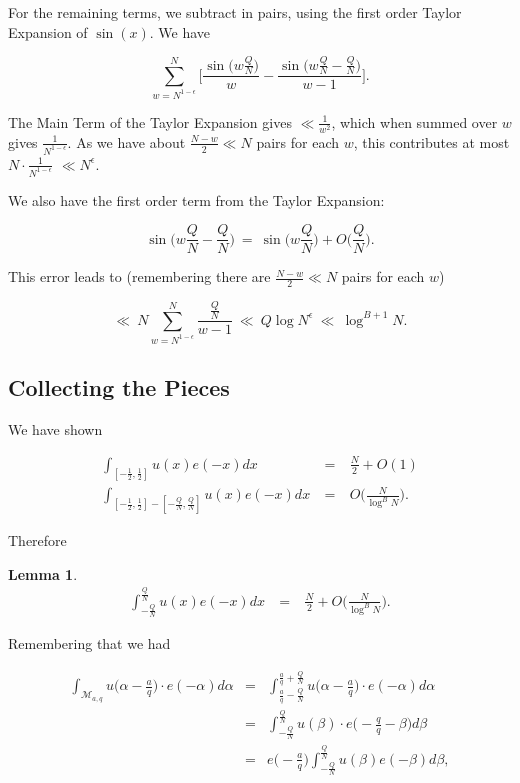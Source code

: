 \documentclass[12pt,letterpaper]{report}
\newcommand\be{\begin{equation}}
\newcommand\ee{\end{equation}}
\newcommand\bea{\begin{eqnarray}}
\newcommand\eea{\end{eqnarray}}
\newcommand{\foh}{\frac{1}{2}}  %
\newtheorem{lem}[thm]{Lemma}
\begin{document}
For the remaining terms, we subtract in pairs, using the first
order Taylor Expansion of $\sin(x)$. We have

\be \sum_{w= N^{1-\epsilon}}^N \Bigg[ \frac{\sin\Big( w
\frac{Q}{N} \Big)}{w} - \frac{\sin\Big( w\frac{Q}{N} - \frac{Q}{N}
\Big)}{w-1} \Bigg]. \ee

The Main Term of the Taylor Expansion gives $\ll \frac{1}{w^2}$,
which when summed over $w$ gives $\frac{1}{N^{1 - \epsilon}}$. As
we have about $\frac{N-w}{2} \ll N$ pairs for each $w$, this
contributes at most $N \cdot \frac{1}{N^{1 - \epsilon}}$ $\ll
N^\epsilon$.

We also have the first order term from the Taylor Expansion:

\be \sin\Big( w\frac{Q}{N} - \frac{Q}{N} \Big) \ = \ \sin\Big(
w\frac{Q}{N} \Big) + O\Big( \frac{Q}{N} \Big). \ee

This error leads to (remembering there are $\frac{N-w}{2} \ll N$
pairs for each $w$)

\be \ll \ N \sum_{w= N^{1-\epsilon}}^N \frac{ \frac{Q}{N} }{w-1} \
\ll \ Q \log N^\epsilon \ \ll \ \log^{B + 1} N. \ee


\subsection{Collecting the Pieces}

We have shown

\bea \int_{[-\foh,\foh]} u(x)e(-x)dx & \ = \ & \frac{N}{2} + O(1)
\nonumber\\ \int_{[-\foh,\foh] - [-\frac{Q}{N},\frac{Q}{N}]}
u(x)e(-x)dx & \ = \ & O\Big( \frac{N}{\log^B N} \Big). \eea

Therefore

\begin{lem}

\bea  \int_{-\frac{Q}{N}}^{\frac{Q}{N}} u(x) e(-x)dx & \ = \ &
\frac{N}{2} + O\Big(\frac{N}{\log^B N}\Big). \eea
\end{lem}


Remembering that we had

\bea \int_{\mathcal{M}_{a,q}} u\Big( \alpha - \frac{a}{q} \Big)
\cdot e(-\alpha)d\alpha  &=&
\int_{\frac{a}{q}-\frac{Q}{N}}^{\frac{a}{q}+\frac{Q}{N}} u\Big(
\alpha - \frac{a}{q} \Big) \cdot e(-\alpha) d\alpha \nonumber\\
&=& \int_{-\frac{Q}{N}}^{\frac{Q}{N}} u(\beta) \cdot
e\Big(-\frac{q}{q} - \beta\Big) d\beta \nonumber\\ &=& e\Big(
-\frac{a}{q} \Big) \int_{-\frac{Q}{N}}^{\frac{Q}{N}} u(\beta)
e(-\beta)d\beta, \eea
\end{document}
